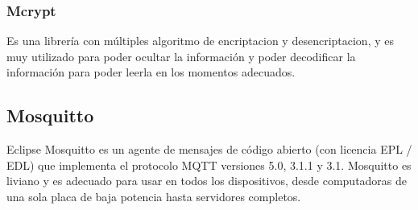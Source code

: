 \subsubsection{Mcrypt}
Es una librería con múltiples algoritmo de encriptacion y desencriptacion, y es muy utilizado para poder ocultar la información y poder decodificar la información para poder leerla en los momentos adecuados.
\subsection{Mosquitto}
Eclipse Mosquitto es un agente de mensajes de código abierto (con licencia EPL / EDL) que implementa el protocolo MQTT versiones 5.0, 3.1.1 y 3.1. Mosquitto es liviano y es adecuado para usar en todos los dispositivos, desde computadoras de una sola placa de baja potencia hasta servidores completos.
